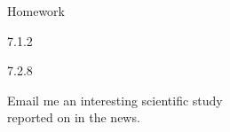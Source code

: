 \begin{frame}{Homework}
  \begin{center}


    7.1.2


    \vspace{2em}

    7.2.8


    \vspace{2em}

    Email me an interesting scientific study \\
    reported on in the news.

  \end{center}
\end{frame}








